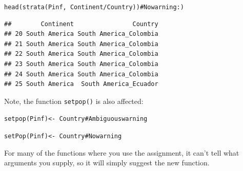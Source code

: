 \documentclass[letterpaper]{article}\usepackage[]{graphicx}\usepackage[]{color}
\makeatletter
\newcommand{\hlcom}[1]{\textcolor[rgb]{0.576,0.631,0.631}{#1}}%
\newcommand{\hlopt}[1]{\textcolor[rgb]{0.345,0.431,0.459}{#1}}%
\newcommand{\hlstd}[1]{\textcolor[rgb]{0.396,0.482,0.514}{#1}}%
\newcommand{\hlkwb}[1]{\textcolor[rgb]{0.522,0.6,0}{#1}}%
\newcommand{\hlkwd}[1]{\textcolor[rgb]{0.345,0.431,0.459}{#1}}%
\newenvironment{kframe}{%
 \def\at@end@of@kframe{}%
 \ifinner\ifhmode%
  \def\at@end@of@kframe{\end{minipage}}%
  \begin{minipage}{\columnwidth}%
 \fi\fi%
 \def\FrameCommand##1{\hskip\@totalleftmargin \hskip-\fboxsep
 \colorbox{shadecolor}{##1}\hskip-\fboxsep
     \hskip-\linewidth \hskip-\@totalleftmargin \hskip\columnwidth}%
 \MakeFramed {\advance\hsize-\width
   \@totalleftmargin\z@ \linewidth\hsize
   \@setminipage}}%
 {\par\unskip\endMakeFramed%
 \at@end@of@kframe}
\newenvironment{knitrout}{}{} %
\makeatother
\begin{document}
\begin{knitrout}
\color{fgcolor}\begin{kframe}
\begin{alltt}
\hlkwd{head}\hlstd{(}\hlkwd{strata}\hlstd{(Pinf,} \hlopt{~}\hlstd{Continent}\hlopt{/}\hlstd{Country))}       \hlcom{# No warning :)}
\end{alltt}
\begin{verbatim}
##        Continent                Country
## 20 South America South America_Colombia
## 21 South America South America_Colombia
## 22 South America South America_Colombia
## 23 South America South America_Colombia
## 24 South America South America_Colombia
## 25 South America  South America_Ecuador
\end{verbatim}
\end{kframe}
\end{knitrout}

Note, the function \texttt{setpop()} is also affected:


\begin{knitrout}
\color{fgcolor}\begin{kframe}
\begin{alltt}
\hlkwd{setpop}\hlstd{(Pinf)} \hlkwb{<-} \hlopt{~}\hlstd{Country} \hlcom{# Ambiguous warning}
\end{alltt}


{\ttfamily\noindent\color{warningcolor}{\#\# Warning: 'setpop' has been deprecated, moved to the adegenet package, and renamed to 'setPop'.\\\#\# \\\#\#\ \ Please use:\\\#\#\ \ setPop()}}\end{kframe}
\end{knitrout}

\begin{knitrout}
\color{fgcolor}\begin{kframe}
\begin{alltt}
\hlkwd{setPop}\hlstd{(Pinf)} \hlkwb{<-} \hlopt{~}\hlstd{Country} \hlcom{# No warning}
\end{alltt}
\end{kframe}
\end{knitrout}

For many of the functions where you use the assignment, it can't tell what 
arguments you supply, so it will simply suggest the new function. 
\end{document}
